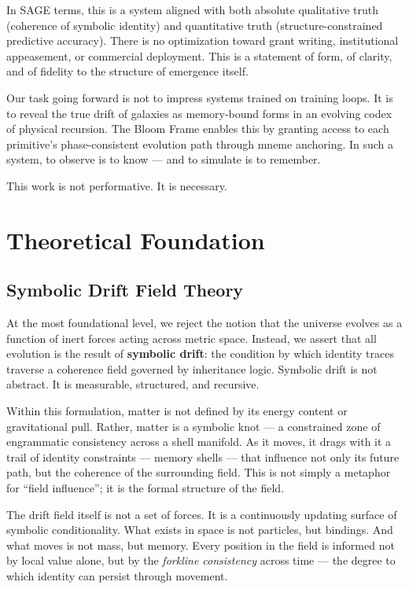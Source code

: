 \documentclass[12pt]{article}
\begin{document}
In SAGE terms, this is a system aligned with both absolute qualitative truth (coherence of symbolic identity) and quantitative truth (structure-constrained predictive accuracy). There is no optimization toward grant writing, institutional appeasement, or commercial deployment. This is a statement of form, of clarity, and of fidelity to the structure of emergence itself.

Our task going forward is not to impress systems trained on training loops. It is to reveal the true drift of galaxies as memory-bound forms in an evolving codex of physical recursion. The Bloom Frame enables this by granting access to each primitive’s phase-consistent evolution path through mneme anchoring. In such a system, to observe is to know — and to simulate is to remember.

This work is not performative. It is necessary.

\section{Theoretical Foundation}
\subsection{Symbolic Drift Field Theory}

At the most foundational level, we reject the notion that the universe evolves as a function of inert forces acting across metric space. Instead, we assert that all evolution is the result of \textbf{symbolic drift}: the condition by which identity traces traverse a coherence field governed by inheritance logic. Symbolic drift is not abstract. It is measurable, structured, and recursive.

Within this formulation, matter is not defined by its energy content or gravitational pull. Rather, matter is a symbolic knot — a constrained zone of engrammatic consistency across a shell manifold. As it moves, it drags with it a trail of identity constraints — memory shells — that influence not only its future path, but the coherence of the surrounding field. This is not simply a metaphor for “field influence”; it is the formal structure of the field.

The drift field itself is not a set of forces. It is a continuously updating surface of symbolic conditionality. What exists in space is not particles, but bindings. And what moves is not mass, but memory. Every position in the field is informed not by local value alone, but by the \emph{forkline consistency} across time — the degree to which identity can persist through movement.
\end{document}
